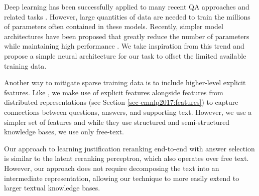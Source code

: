 Deep learning has been successfully applied to many recent QA approaches and related tasks \citep[][inter alia]{Bordes2015LargescaleSQ,nips15_hermann, He2016CharacterLevelQA, dong2015question, Tan2016ImprovedRL}.
However, large quantities of data are needed to train the millions of parameters often contained in these models.  
Recently, simpler model architectures have been proposed that greatly reduce the number of parameters while maintaining high performance \cite[e.g.,][]{Iyyer2015,chen2016thorough,Parikh2016ADA}.  
We take inspiration from this trend and propose a simple neural architecture for our task to offset the limited available training data. 


Another way to mitigate sparse training data is to include higher-level explicit features.  Like \citet{sachan2016science}, we make use of explicit features alongside features from distributed representations (see Section \ref{sec-emnlp2017:features}) to capture connections between questions, answers, and supporting text.  However, we use a simpler set of features and while they use structured and semi-structured knowledge bases, we use only free-text.  %

Our approach to learning justification reranking end-to-end with answer selection is similar to the \citet[][described in Chapter \ref{chapter:cl2017}]{jansen2017framing} latent reranking perceptron,  which also operates over free text.  However, our approach does not require decomposing the text into an intermediate representation, allowing our technique to more easily extend to larger textual knowledge bases.  

